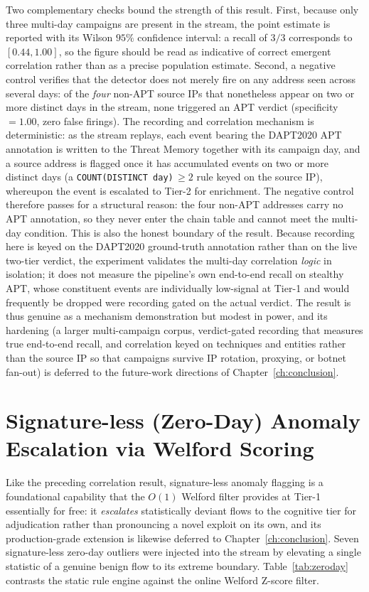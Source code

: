 Two complementary checks bound the strength of this result. First, because only three multi-day campaigns are present in the stream, the point estimate is reported with its Wilson $95\%$ confidence interval: a recall of $3/3$ corresponds to $[0.44, 1.00]$, so the figure should be read as indicative of correct emergent correlation rather than as a precise population estimate. Second, a negative control verifies that the detector does not merely fire on any address seen across several days: of the \emph{four} non-APT source IPs that nonetheless appear on two or more distinct days in the stream, none triggered an APT verdict (specificity $=1.00$, zero false firings). The recording and correlation mechanism is deterministic: as the stream replays, each event bearing the DAPT2020 APT annotation is written to the Threat Memory together with its campaign day, and a source address is flagged once it has accumulated events on two or more distinct days (a \texttt{COUNT(DISTINCT day)}$\,\ge 2$ rule keyed on the source IP), whereupon the event is escalated to Tier-2 for enrichment. The negative control therefore passes for a structural reason: the four non-APT addresses carry no APT annotation, so they never enter the chain table and cannot meet the multi-day condition. This is also the honest boundary of the result. Because recording here is keyed on the DAPT2020 ground-truth annotation rather than on the live two-tier verdict, the experiment validates the multi-day correlation \emph{logic} in isolation; it does not measure the pipeline's own end-to-end recall on stealthy APT, whose constituent events are individually low-signal at Tier-1 and would frequently be dropped were recording gated on the actual verdict. The result is thus genuine as a mechanism demonstration but modest in power, and its hardening (a larger multi-campaign corpus, verdict-gated recording that measures true end-to-end recall, and correlation keyed on techniques and entities rather than the source IP so that campaigns survive IP rotation, proxying, or botnet fan-out) is deferred to the future-work directions of Chapter~\ref{ch:conclusion}.

\section{Signature-less (Zero-Day) Anomaly Escalation via Welford Scoring}
Like the preceding correlation result, signature-less anomaly flagging is a foundational capability that the $O(1)$ Welford filter provides at Tier-1 essentially for free: it \emph{escalates} statistically deviant flows to the cognitive tier for adjudication rather than pronouncing a novel exploit on its own, and its production-grade extension is likewise deferred to Chapter~\ref{ch:conclusion}. Seven signature-less zero-day outliers were injected into the stream by elevating a single statistic of a genuine benign flow to its extreme boundary. Table~\ref{tab:zeroday} contrasts the static rule engine against the online Welford Z-score filter.

